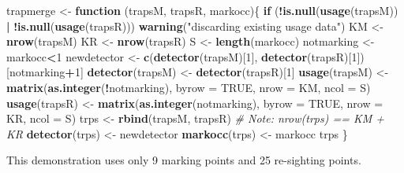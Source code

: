 \documentclass[
]{book}
\newenvironment{Shaded}{\begin{snugshade}}{\end{snugshade}}
\newcommand{\AttributeTok}[1]{\textcolor[rgb]{0.13,0.29,0.53}{#1}}
\newcommand{\CommentTok}[1]{\textcolor[rgb]{0.56,0.35,0.01}{\textit{#1}}}
\newcommand{\ConstantTok}[1]{\textcolor[rgb]{0.56,0.35,0.01}{#1}}
\newcommand{\ControlFlowTok}[1]{\textcolor[rgb]{0.13,0.29,0.53}{\textbf{#1}}}
\newcommand{\DecValTok}[1]{\textcolor[rgb]{0.00,0.00,0.81}{#1}}
\newcommand{\FunctionTok}[1]{\textcolor[rgb]{0.13,0.29,0.53}{\textbf{#1}}}
\newcommand{\NormalTok}[1]{#1}
\newcommand{\OtherTok}[1]{\textcolor[rgb]{0.56,0.35,0.01}{#1}}
\newcommand{\SpecialCharTok}[1]{\textcolor[rgb]{0.81,0.36,0.00}{\textbf{#1}}}
\newcommand{\StringTok}[1]{\textcolor[rgb]{0.31,0.60,0.02}{#1}}
\begin{document}
\begin{Shaded}
\begin{Highlighting}[]
\NormalTok{trapmerge }\OtherTok{\textless{}{-}} \ControlFlowTok{function}\NormalTok{ (trapsM, trapsR, markocc)\{}
    \ControlFlowTok{if}\NormalTok{ (}\SpecialCharTok{!}\FunctionTok{is.null}\NormalTok{(}\FunctionTok{usage}\NormalTok{(trapsM)) }\SpecialCharTok{|} \SpecialCharTok{!}\FunctionTok{is.null}\NormalTok{(}\FunctionTok{usage}\NormalTok{(trapsR)))}
        \FunctionTok{warning}\NormalTok{(}\StringTok{"discarding existing usage data"}\NormalTok{)}
\NormalTok{    KM }\OtherTok{\textless{}{-}} \FunctionTok{nrow}\NormalTok{(trapsM)}
\NormalTok{    KR }\OtherTok{\textless{}{-}} \FunctionTok{nrow}\NormalTok{(trapsR)}
\NormalTok{    S }\OtherTok{\textless{}{-}} \FunctionTok{length}\NormalTok{(markocc)}
\NormalTok{    notmarking }\OtherTok{\textless{}{-}}\NormalTok{ markocc}\SpecialCharTok{\textless{}}\DecValTok{1}
\NormalTok{    newdetector }\OtherTok{\textless{}{-}} \FunctionTok{c}\NormalTok{(}\FunctionTok{detector}\NormalTok{(trapsM)[}\DecValTok{1}\NormalTok{], }\FunctionTok{detector}\NormalTok{(trapsR)[}\DecValTok{1}\NormalTok{])[notmarking}\SpecialCharTok{+}\DecValTok{1}\NormalTok{]}
    \FunctionTok{detector}\NormalTok{(trapsM) }\OtherTok{\textless{}{-}} \FunctionTok{detector}\NormalTok{(trapsR)[}\DecValTok{1}\NormalTok{]}
    \FunctionTok{usage}\NormalTok{(trapsM) }\OtherTok{\textless{}{-}} \FunctionTok{matrix}\NormalTok{(}\FunctionTok{as.integer}\NormalTok{(}\SpecialCharTok{!}\NormalTok{notmarking), }\AttributeTok{byrow =} \ConstantTok{TRUE}\NormalTok{, }
                            \AttributeTok{nrow =}\NormalTok{ KM, }\AttributeTok{ncol =}\NormalTok{ S)}
    \FunctionTok{usage}\NormalTok{(trapsR) }\OtherTok{\textless{}{-}} \FunctionTok{matrix}\NormalTok{(}\FunctionTok{as.integer}\NormalTok{(notmarking), }\AttributeTok{byrow =} \ConstantTok{TRUE}\NormalTok{, }
                            \AttributeTok{nrow =}\NormalTok{ KR, }\AttributeTok{ncol =}\NormalTok{ S)}
\NormalTok{    trps }\OtherTok{\textless{}{-}} \FunctionTok{rbind}\NormalTok{(trapsM, trapsR)}
    \CommentTok{\# Note: nrow(trps) == KM + KR}
    \FunctionTok{detector}\NormalTok{(trps) }\OtherTok{\textless{}{-}}\NormalTok{ newdetector}
    \FunctionTok{markocc}\NormalTok{(trps) }\OtherTok{\textless{}{-}}\NormalTok{ markocc}
\NormalTok{    trps}
\NormalTok{\}}
\end{Highlighting}
\end{Shaded}

This demonstration uses only 9 marking points and 25 re-sighting points.
\end{document}
